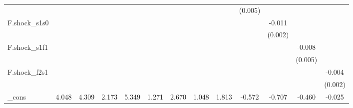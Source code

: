 {\begin{tabular}{l*{12}{c}}
            &                     &                     &                     &                     &                     &                     &                     &                     &     (0.005)         &                     &                     &                     \\
\addlinespace
F.shock\_s1s0&                     &                     &                     &                     &                     &                     &                     &                     &                     &      -0.011\sym{***}&                     &                     \\
            &                     &                     &                     &                     &                     &                     &                     &                     &                     &     (0.002)         &                     &                     \\
\addlinespace
F.shock\_s1f1&                     &                     &                     &                     &                     &                     &                     &                     &                     &                     &      -0.008         &                     \\
            &                     &                     &                     &                     &                     &                     &                     &                     &                     &                     &     (0.005)         &                     \\
\addlinespace
F.shock\_f2s1&                     &                     &                     &                     &                     &                     &                     &                     &                     &                     &                     &      -0.004\sym{**} \\
            &                     &                     &                     &                     &                     &                     &                     &                     &                     &                     &                     &     (0.002)         \\
\addlinespace
\_cons      &       4.048\sym{***}&       4.309\sym{***}&       2.173\sym{**} &       5.349\sym{***}&       1.271         &       2.670\sym{**} &       1.048\sym{*}  &       1.813\sym{*}  &      -0.572         &      -0.707         &      -0.460\sym{**} &      -0.025         \\

\end{tabular}}
